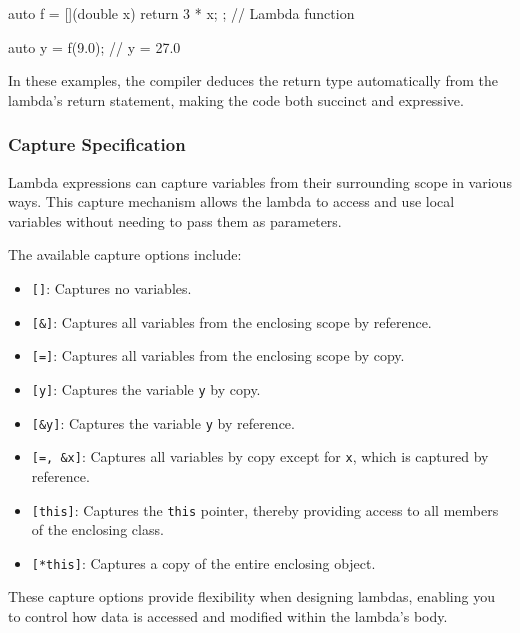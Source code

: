 \vspace{-0.5em}

\begin{codeblock}[language=C++]
auto f = [](double x) { return 3 * x; }; // Lambda function

auto y = f(9.0); // y = 27.0
\end{codeblock}

\vspace{-0.5em}

In these examples, the compiler deduces the return type automatically from the lambda's return statement, making the code both succinct and expressive.

\vspace{-0.5em}

\subsubsection{Capture Specification}

Lambda expressions can capture variables from their surrounding scope in various ways. This capture mechanism allows the lambda to access and use local variables without needing to pass them as parameters.

The available capture options include:

\begin{itemize}
    \item \texttt{[]}: Captures no variables.
    \item \texttt{[\&]}: Captures all variables from the enclosing scope by reference.
    \item \texttt{[=]}: Captures all variables from the enclosing scope by copy.
    \item \texttt{[y]}: Captures the variable \texttt{y} by copy.
    \item \texttt{[\&y]}: Captures the variable \texttt{y} by reference.
    \item \texttt{[=, \&x]}: Captures all variables by copy except for \texttt{x}, which is captured by reference.
    \item \texttt{[this]}: Captures the \texttt{this} pointer, thereby providing access to all members of the enclosing class.
    \item \texttt{[*this]}: Captures a copy of the entire enclosing object.
\end{itemize}

These capture options provide flexibility when designing lambdas, enabling you to control how data is accessed and modified within the lambda's body.

